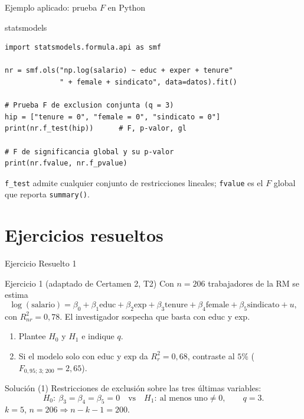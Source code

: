 \documentclass{beamer}
\begin{document}
\begin{frame}[fragile]{Ejemplo aplicado: prueba $F$ en Python}
\begin{exampleblock}{statsmodels}
\begin{verbatim}
import statsmodels.formula.api as smf

nr = smf.ols("np.log(salario) ~ educ + exper + tenure"
             " + female + sindicato", data=datos).fit()

# Prueba F de exclusion conjunta (q = 3)
hip = ["tenure = 0", "female = 0", "sindicato = 0"]
print(nr.f_test(hip))      # F, p-valor, gl

# F de significancia global y su p-valor
print(nr.fvalue, nr.f_pvalue)
\end{verbatim}
\end{exampleblock}
{\small \texttt{f\_test} admite cualquier conjunto de restricciones lineales; \texttt{fvalue} es el $F$ global que reporta \texttt{summary()}.}
\end{frame}

\section{Ejercicios resueltos}

\begin{frame}{Ejercicio Resuelto 1}

\begin{block}{Ejercicio 1 (adaptado de Certamen 2, T2)}
Con $n=206$ trabajadores de la RM se estima
\[ \log(\text{salario}) = \beta_0 + \beta_1\text{educ} + \beta_2\text{exp} + \beta_3\text{tenure} + \beta_4\text{female} + \beta_5\text{sindicato} + u, \]
con $R^2_{nr}=0{,}78$. El investigador sospecha que basta con $\text{educ}$ y $\text{exp}$.
\begin{enumerate}
    \item Plantee $H_0$ y $H_1$ e indique $q$.
    \item Si el modelo solo con $\text{educ}$ y $\text{exp}$ da $R^2_r=0{,}68$, contraste al $5\%$ ($F_{0{,}95;\,3;\,200}=2{,}65$).
\end{enumerate}
\end{block}

\pause

\begin{exampleblock}{Solución (1)}
Restricciones de exclusión sobre las tres últimas variables:
\[ H_0:\ \beta_3=\beta_4=\beta_5=0 \quad\text{vs}\quad H_1:\ \text{al menos uno}\neq 0,\qquad q=3. \]
$k=5$, $n=206 \Rightarrow n-k-1 = 200$.
\end{exampleblock}

\end{frame}
\end{document}
